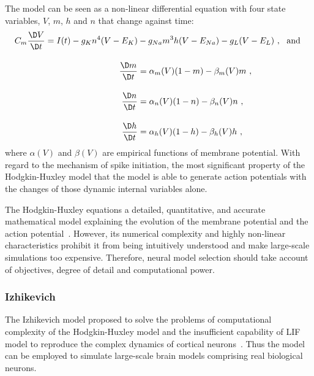 The \DIFdelbegin {}\DIFdelend \DIFaddbegin {}\DIFaddend model can be seen as a non-linear differential equation with four state variables, $V$, $m$, $h$ and $n$ that change against time:
\begin{equation}
\begin{aligned}
C_m \dfrac{\D V}{\D t} = I(t) - g_{K}n^4(V-E_{K}) &- g_{Na}m^3h(V-E_{Na}) - g_L(V-E_L)~, \textrm{~~and }\\[10pt]
\dfrac{\D m}{\D t} &= \alpha_m(V)(1-m) - \beta_m(V)m~, \\[10pt]
\dfrac{\D n}{\D t} &= \alpha_n(V)(1-n) - \beta_n(V)n~, \\[10pt]
\dfrac{\D h}{\D t} &= \alpha_h(V)(1-h) - \beta_h(V)h~,
\end{aligned}
\end{equation} 
where $\alpha(V)$ and  $\beta(V)$ are empirical functions of membrane potential.
With regard to the mechanism of spike initiation, \DIFdelbegin {}\DIFdelend the most significant property of the Hodgkin-Huxley model \DIFaddbegin {}\DIFaddend that the model is able to generate action potentials with the changes of those dynamic internal variables alone.

The Hodgkin-Huxley equations \DIFdelbegin {}\DIFdelend \DIFaddbegin {}\DIFaddend a detailed, quantitative, and \DIFdelbegin {}\DIFdelend \DIFaddbegin {}\DIFaddend accurate mathematical model explaining the evolution of the membrane potential and the action potential~\DIFdelbegin {}\DIFdelend \DIFaddbegin {}\DIFaddend .
However, its numerical complexity and highly non-linear characteristics prohibit it from being intuitively understood and make large-scale simulations too expensive.
Therefore, neural model selection should take account of objectives, degree of detail and computational power.

\subsubsection{Izhikevich \DIFaddbegin {}\DIFaddend }
The Izhikevich model \DIFdelbegin {}\DIFdelend \DIFaddbegin {}\DIFaddend proposed to solve the problems of computational complexity of the Hodgkin-Huxley model and the insufficient capability of LIF model to reproduce the complex dynamics of cortical neurons~\DIFdelbegin {}\DIFdelend \DIFaddbegin {}\DIFaddend .
Thus the model can be employed to simulate large-scale brain models comprising \DIFdelbegin {}\DIFdelend real biological neurons.

